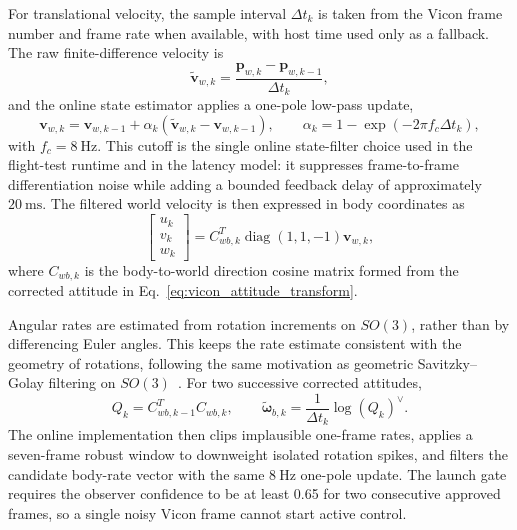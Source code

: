 For translational velocity, the sample interval \(\Delta t_k\) is taken from
the Vicon frame number and frame rate when available, with host time used only
as a fallback. The raw finite-difference velocity is
\begin{equation}
    \tilde{\mathbf{v}}_{w,k}
    =
    \frac{\mathbf{p}_{w,k}-\mathbf{p}_{w,k-1}}{\Delta t_k},
    \label{eq:vicon_raw_velocity}
\end{equation}
and the online state estimator applies a one-pole low-pass update,
\begin{equation}
    \mathbf{v}_{w,k}
    =
    \mathbf{v}_{w,k-1}
    +
    \alpha_k
    \left(
    \tilde{\mathbf{v}}_{w,k}-\mathbf{v}_{w,k-1}
    \right),
    \qquad
    \alpha_k = 1-\exp\left(-2\pi f_c\Delta t_k\right),
    \label{eq:vicon_velocity_filter}
\end{equation}
with \(f_c=8~\mathrm{Hz}\). This cutoff is the single online state-filter
choice used in the flight-test runtime and in the latency model: it suppresses
frame-to-frame differentiation noise while adding a bounded feedback delay of
approximately \(20~\mathrm{ms}\). The filtered world velocity is then expressed
in body coordinates as
\begin{equation}
    \begin{bmatrix}u_k\\v_k\\w_k\end{bmatrix}
    =
    C_{wb,k}^{T}
    \operatorname{diag}(1,1,-1)
    \mathbf{v}_{w,k},
    \label{eq:vicon_body_velocity}
\end{equation}
where \(C_{wb,k}\) is the body-to-world direction cosine matrix formed from the
corrected attitude in Eq.~\eqref{eq:vicon_attitude_transform}.

Angular rates are estimated from rotation increments on \(SO(3)\), rather than
by differencing Euler angles. This keeps the rate estimate consistent with the
geometry of rotations, following the same motivation as geometric
Savitzky--Golay filtering on \(SO(3)\)~\cite{jongeneel2022geometric}. For two
successive corrected attitudes,
\begin{equation}
    Q_k = C_{wb,k-1}^{T}C_{wb,k},
    \qquad
    \tilde{\boldsymbol{\omega}}_{b,k}
    =
    \frac{1}{\Delta t_k}\log(Q_k)^{\vee}.
    \label{eq:vicon_so3_rate}
\end{equation}
The online implementation then clips implausible one-frame rates, applies a
seven-frame robust window to downweight isolated rotation spikes, and filters
the candidate body-rate vector with the same \(8~\mathrm{Hz}\) one-pole update.
The launch gate requires the observer confidence to be at least 0.65 for two
consecutive approved frames, so a single noisy Vicon frame cannot start active
control.

